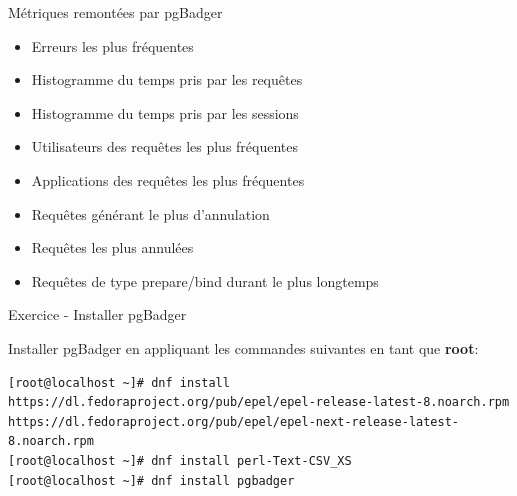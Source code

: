 
\begin{frame}{Métriques remontées par pgBadger}

   \begin{itemize}
      \item Erreurs les plus fréquentes
      \item Histogramme du temps pris par les requêtes
      \item Histogramme du temps pris par les sessions
      \item Utilisateurs des requêtes les plus fréquentes
      \item Applications des requêtes les plus fréquentes
      \item Requêtes générant le plus d'annulation
      \item Requêtes les plus annulées
      \item Requêtes de type prepare/bind durant le plus longtemps
   \end{itemize}

\end{frame}


\begin{frame}[fragile]{Exercice - Installer pgBadger}

   Installer pgBadger en appliquant les commandes suivantes en tant que \textbf{root}:


\begin{tiny}
\begin{Verbatim}[commandchars=\\\{\}]
[root@localhost ~]# dnf install https://dl.fedoraproject.org/pub/epel/epel-release-latest-8.noarch.rpm https://dl.fedoraproject.org/pub/epel/epel-next-release-latest-8.noarch.rpm
[root@localhost ~]# dnf install perl-Text-CSV_XS
[root@localhost ~]# dnf install pgbadger
\end{Verbatim}
\end{tiny}

\end{frame}


